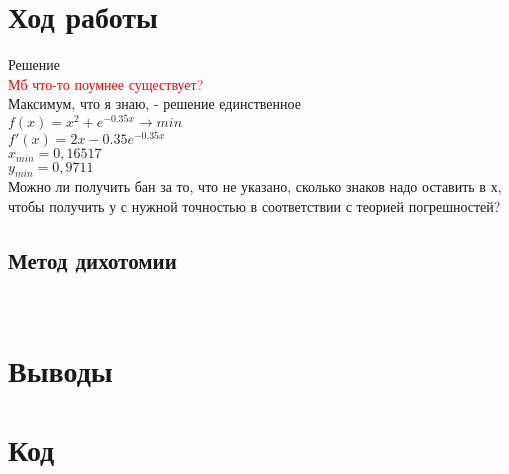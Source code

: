 \section{Ход работы}

\begin{multicols}{2}
  \noindent Решение\\[2mm]
  \textcolor{red}{Мб что-то поумнее существует?}\\
  Максимум, что я знаю, - решение единственное\\
  \(f(x) = x^2 + e^{-0.35x} \to min\)\\
  \(f'(x) = 2x - 0.35e^{-0.35x}\)\\
  \(x_{min} = 0,16517\)\\
  \(y_{min} = 0,9711\)\\
  Можно ли получить бан за то, что не указано, сколько знаков надо оставить в х, чтобы получить у с нужной точностью в соответствии с теорией погрешностей?
\end{multicols}



\subsection{Метод дихотомии}

\\[2mm]


\section{Выводы}


\newpage
\section{Код}



